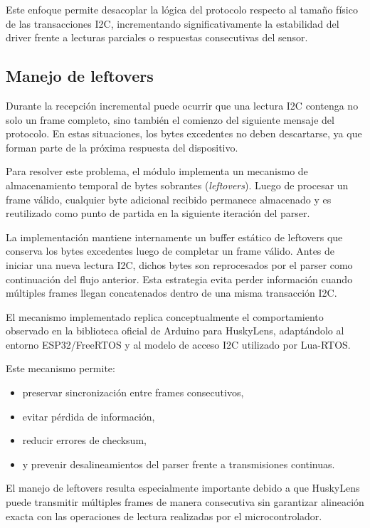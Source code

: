 \documentclass{prgrado}
\begin{document}
Este enfoque permite desacoplar la lógica del protocolo respecto al tamaño físico
de las transacciones I2C, incrementando significativamente la estabilidad del
driver frente a lecturas parciales o respuestas consecutivas del sensor.

\subsection{Manejo de leftovers}

Durante la recepción incremental puede ocurrir que una lectura I2C contenga no
solo un frame completo, sino también el comienzo del siguiente mensaje del
protocolo. En estas situaciones, los bytes excedentes no deben descartarse,
ya que forman parte de la próxima respuesta del dispositivo.

Para resolver este problema, el módulo implementa un mecanismo de almacenamiento
temporal de bytes sobrantes (\textit{leftovers}). Luego de procesar un frame
válido, cualquier byte adicional recibido permanece almacenado y es reutilizado
como punto de partida en la siguiente iteración del parser.

La implementación mantiene internamente un buffer estático de leftovers que conserva los bytes excedentes luego de completar un frame válido. Antes de iniciar una nueva lectura I2C, dichos bytes son reprocesados por el parser como continuación del flujo anterior. Esta estrategia evita perder información cuando múltiples frames llegan concatenados dentro de una misma transacción I2C.

El mecanismo implementado replica conceptualmente el comportamiento observado en la biblioteca oficial de Arduino para HuskyLens, adaptándolo al entorno ESP32/FreeRTOS y al modelo de acceso I2C utilizado por Lua-RTOS.

Este mecanismo permite:

\begin{itemize}
    \item preservar sincronización entre frames consecutivos,
    \item evitar pérdida de información,
    \item reducir errores de checksum,
    \item y prevenir desalineamientos del parser frente a transmisiones continuas.
\end{itemize}

El manejo de leftovers resulta especialmente importante debido a que HuskyLens
puede transmitir múltiples frames de manera consecutiva sin garantizar alineación
exacta con las operaciones de lectura realizadas por el microcontrolador.
\end{document}
